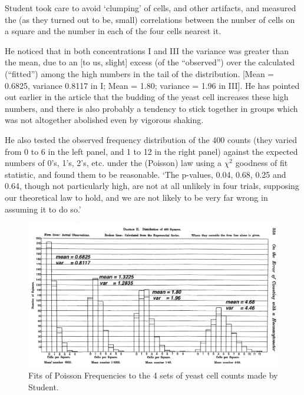 \documentclass[]{book}
\begin{document}
Student took care to avoid `clumping' of cells, and other artifacts, and measured the (as they turned out to be, small) correlations between the nunber of cells on a square and the number in each of the four cells nearest it.

He noticed that in both concentrations I and III the variance was greater than the mean, due to an {[}to us, slight{]} excess (of the ``observed'') over the calculated (``fitted'') among the high numbers in the tail of the distribution. {[}Mean = 0.6825, variance 0.8117 in I; Mean = 1.80; variance = 1.96 in III{]}. He has pointed out earlier in the article that the budding of the yeast cell increases these high numbers, and there is also probably a tendency to stick together in groups which was not altogether abolished even by vigorous shaking.

He also tested the observed frequency distribution of the 400 counts (they varied from 0 to 6 in the left panel, and 1 to 12 in the right panel) against the expected numbers of 0's, 1's, 2's, etc. under the (Poisson) law using a \(\chi^2\) goodness of fit statistic, and found them to be reasonable. `The p-values, 0.04, 0.68, 0.25 and 0.64, though not particularly high,
are not at all unlikely in four trials, supposing our theoretical law to hold, and we are not likely to be very far wrong in assuming it to do so.'

\begin{figure}

{\centering \includegraphics[width=19.17in]{images/StudentPoissonFits} 

}

\caption{Fits of Poisson Frequencies to the 4 sets of yeast cell counts made by Student.}\label{fig:unnamed-chunk-79}
\end{figure}
\end{document}
